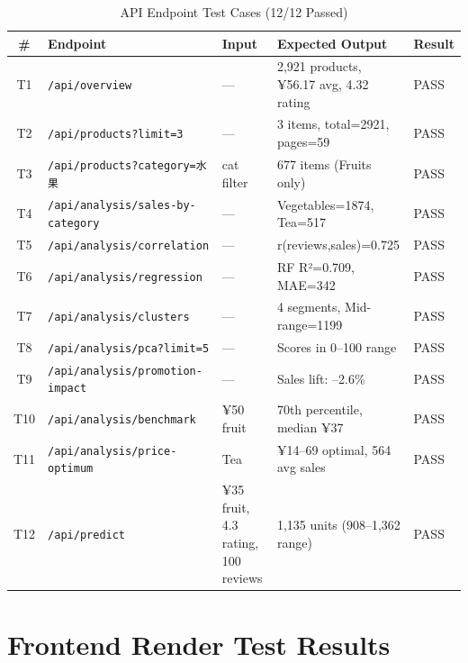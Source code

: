 \documentclass[12pt,a4paper]{report}
\begin{document}
\begin{table}[H]
  \centering
  \caption{API Endpoint Test Cases (12/12 Passed)}
  \begin{tabular}{@{}clp{3.5cm}p{4cm}l@{}}
    \toprule
    \textbf{\#} & \textbf{Endpoint} & \textbf{Input} & \textbf{Expected Output} & \textbf{Result} \\
    \midrule
    T1  & \texttt{/api/overview}  & ---   & 2,921 products, ¥56.17 avg, 4.32 rating & PASS \\
    T2  & \texttt{/api/products?limit=3} & ---   & 3 items, total=2921, pages=59 & PASS \\
    T3  & \texttt{/api/products?category=水果} & cat filter  & 677 items (Fruits only)   & PASS \\
    T4  & \texttt{/api/analysis/sales-by-category} & --- & Vegetables=1874, Tea=517  & PASS \\
    T5  & \texttt{/api/analysis/correlation} & --- & r(reviews,sales)=0.725            & PASS \\
    T6  & \texttt{/api/analysis/regression} & ---  & RF R²=0.709, MAE=342       & PASS \\
    T7  & \texttt{/api/analysis/clusters} & ---    & 4 segments, Mid-range=1199  & PASS \\
    T8  & \texttt{/api/analysis/pca?limit=5} & --- & Scores in 0--100 range      & PASS \\
    T9  & \texttt{/api/analysis/promotion-impact} & --- & Sales lift: --2.6\%        & PASS \\
    T10 & \texttt{/api/analysis/benchmark} & ¥50 fruit & 70th percentile, median ¥37 & PASS \\
    T11 & \texttt{/api/analysis/price-optimum} & Tea & ¥14--69 optimal, 564 avg sales & PASS \\
    T12 & \texttt{/api/predict} & ¥35 fruit, 4.3 rating, 100 reviews & 1,135 units (908--1,362 range) & PASS \\
    \bottomrule
  \end{tabular}
\end{table}

\section{Frontend Render Test Results}
\end{document}
